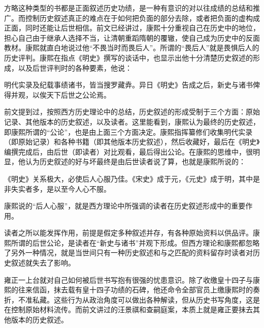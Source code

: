 
方略这种类型的书都是正面叙述历史功绩，是一种有意识的对以往成绩的总结和推广。而控制历史叙述真正的难点在于如何把负面的部分去除，或者把负面的虚构成正面，同时还能让后世相信。前文已经讲过，康熙十分重视自己在历史中的地位，担心自己由于继承人选择不当，让清朝重蹈隋朝的覆辙，使自己成为历史中的反面教材。康熙就直白地说过他“不畏当时而畏后人”。所谓的“畏后人”就是畏惧后人的历史评判。康熙在指点《明史》撰写的谈话中，也显示出他十分清楚历史叙述的形成，以及后世评判时的各种要素，他说：



\begin{bookquote}明代实录及纪载事绩诸书，皆当搜罗藏弆。异日《明史》告成之后，新史与诸书俾得并观，以俟天下后世之公论焉。\end{bookquote}


前文提到过，按照西方历史理论中的总结，历史叙述的形成受制于三个方面：原始记录、其他版本的历史叙述，以及读者。这里能看到，康熙认为最终的历史叙述，即康熙所谓的“公论”，也是由上面三个方面决定。康熙指挥纂修们收集明代实录（即原始记录）和各种书籍（即其他版本历史叙述），然后收藏好，最后在《明史》编撰完成后，由后世（即读者）对比观看，最后得出公论。在康熙的思维中，很明显，他认为历史叙述的好与坏最终是由后世读者说了算，也就是康熙所说的：



\begin{bookquote}《明史》关系极大，必使后人心服乃佳。《宋史》成于元，《元史》成于明，其中是非失实者多，是以至今人心不服。\end{bookquote}


康熙说的“后人心服”，就是西方理论中所强调的读者在历史叙述形成中的重要作用。



读者之所以能发挥作用，前提是假定多种叙述并存，有各种原始资料以供品评。康熙所谓的后世公论，是读者在“新史与诸书”并观下形成。但西方理论和康熙都忽略了另外一种情况，就是当世间只有一种历史叙述和与之匹配的资料留存时读者对历史叙述就失去了影响。



雍正一上台就对自己如何被后世书写抱有很强的忧患意识。除了收缴皇十四子与康熙的往来信函，抹去载有皇十四子功绩的石碑，他还命令全部官员上缴康熙时的奏折，不准私藏。这些行为从政治角度可以做出各种解读，但从历史书写角度，这是在控制原始材料流传。而前文讲过的汪景祺和查嗣庭案，本质上就是雍正要抹去其他版本的历史叙述。


